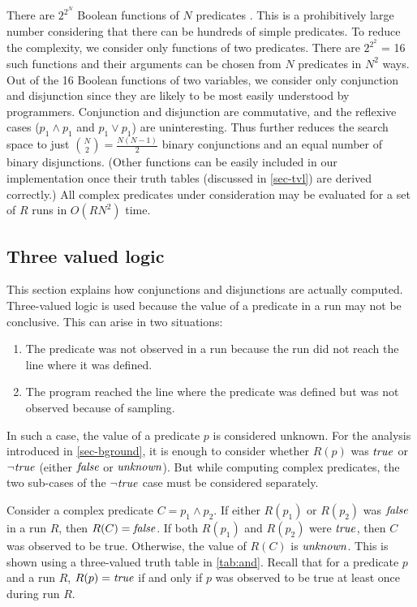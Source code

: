 There are $2^{2^N}$ Boolean functions of $N$ predicates \cite{MathWorld:BoolFuncs}.  This is a prohibitively large number considering that there can be hundreds of simple predicates.  To reduce the complexity, we consider only functions of two predicates.  There are $2^{2^2}$ = 16 such functions and their arguments can be chosen from $N$ predicates in $N^2$ ways.  Out of the 16 Boolean functions of two variables, we consider only conjunction and disjunction since they are likely to be most easily understood by programmers.  Conjunction and disjunction are commutative, and the reflexive cases ($p_1 \wedge p_1$ and $p_1 \vee p_1$) are uninteresting.  Thus further reduces the search space to just ${N \choose 2} = \frac{N (N-1)}{2}$ binary conjunctions and an equal number of binary disjunctions.  (Other functions can be easily included in our implementation once their truth tables (discussed in \autoref{sec-tvl}) are derived correctly.)  All complex predicates under consideration may be evaluated for a set of $R$ runs in $O(R N^2)$ time.

\subsection{Three valued logic}
\label{sec-tvl}
This section explains how conjunctions and disjunctions are actually computed.  Three-valued logic is used because the value of a predicate in a run may not be conclusive. This can arise in two situations:
\begin{enumerate}
\item The predicate was not observed in a run because the run did not reach the line where it was defined.
\item The program reached the line where the predicate was defined but was not observed because of sampling.
\end{enumerate}

In such a case, the value of a predicate $p$ is considered unknown.  For the analysis introduced in \autoref{sec-bground}, it is enough to consider whether $R(p)$ was $\mathit{true}$ or $\neg \mathit{true}$ (either $\mathit{false}$ or $\mathit{unknown}$).  But while computing complex predicates, the two sub-cases of the $\neg \mathit{true}$ case must be considered separately.

Consider a complex predicate $C = p_1 \wedge p_2$.  If either $R(p_1)$ or $R(p_2)$ was $\mathit{false}$ in a run $R$, then $R(C) = \mathit{false}$.  If both $R(p_1)$ and $R(p_2)$ were $\mathit{true}$, then $C$ was observed to be true.  Otherwise, the value of $R(C)$ is $\mathit{unknown}$. This is shown using a three-valued truth table in \autoref{tab:and}. Recall that for a predicate $p$ and a run $R$, $R(p) = \mathit{true}$ if and only if $p$ was observed to be true at least once during run $R$.  

